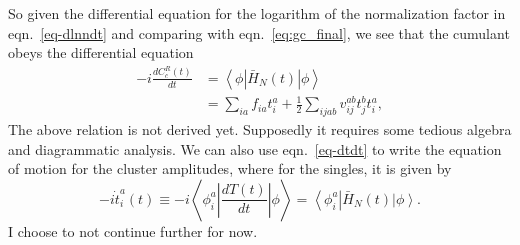 So given the differential equation for the logarithm of the normalization factor in eqn.~\ref{eq-dlnndt} and comparing with eqn.~\ref{eq:gc_final}, we see that the cumulant obeys the differential equation
\begin{equation}
\label{eqn:matel1}
\begin{split}
-i\frac{d C_c^R(t)}{dt} &= \left< \phi \left| \bar{H}_N(t) \right| \phi \right> \\
&= \sum_{ia} f_{ia} t_i^a +
\frac{1}{2} \sum_{ijab} v_{ij}^{ab} t_j^b t_i^a,
\end{split}
\end{equation}
\color{red} {The above relation is not derived yet. Supposedly it requires some tedious
algebra and diagrammatic analysis.} \color{black} We can also use eqn.~\ref{eq-dtdt} to write the equation of motion for the cluster amplitudes, where for the singles, it is given by
\begin{equation}
\label{eq:rt_eom_ccs}
-i \dot {t}_i^a(t) \equiv -i \left< \phi_{i}^{a} \left| \frac{d T(t)}{dt} \right| \phi \right>
= \left< \phi_{i}^{a} \right| \bar{H}_N(t) \left| \phi \right>.
\end{equation}
I choose to not continue further for now.


